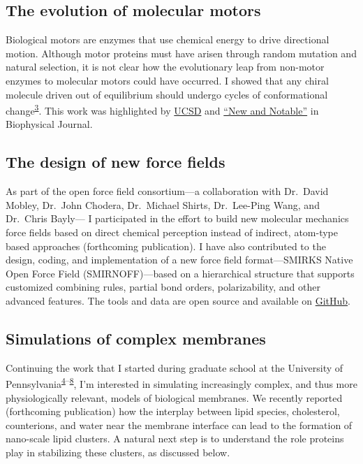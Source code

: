 \documentclass[11pt,notitlepage]{article}
\begin{document}
\hypertarget{the-evolution-of-molecular-motors}{%
\subsection{The evolution of molecular
motors}\label{the-evolution-of-molecular-motors}}

Biological motors are enzymes that use chemical energy to drive
directional motion. Although motor proteins must have arisen through
random mutation and natural selection, it is not clear how the
evolutionary leap from non-motor enzymes to molecular motors could have
occurred. I showed that any chiral molecule driven out of equilibrium
should undergo cycles of conformational
change\textsuperscript{\protect\hyperlink{ref-1BfYw0gk2}{3}}. This work
was highlighted by
\href{http://ucsdhealthsciences.tumblr.com/post/173707350285/its-not-intelligent-design-so-how-did}{UCSD}
and
\href{https://www.cell.com/biophysj/fulltext/S0006-3495(18)30444-2}{``New
and Notable''} in Biophysical Journal.

\hypertarget{the-design-of-new-force-fields}{%
\subsection{The design of new force
fields}\label{the-design-of-new-force-fields}}

As part of the open force field consortium---a collaboration with
Dr.~David Mobley, Dr.~John Chodera, Dr.~Michael Shirts, Dr.~Lee-Ping
Wang, and Dr.~Chris Bayly--- I participated in the effort to build new
molecular mechanics force fields based on direct chemical perception
instead of indirect, atom-type based approaches (forthcoming
publication). I have also contributed to the design, coding, and
implementation of a new force field format---SMIRKS Native Open Force
Field (SMIRNOFF)---based on a hierarchical structure that supports
customized combining rules, partial bond orders, polarizability, and
other advanced features. The tools and data are open source and
available on \href{https://github.com/openforcefield}{GitHub}.

\hypertarget{simulations-of-complex-membranes}{%
\subsection{Simulations of complex
membranes}\label{simulations-of-complex-membranes}}

Continuing the work that I started during graduate school at the
University of
Pennsylvania\textsuperscript{\protect\hyperlink{ref-1G0A01ZNq}{4}--\protect\hyperlink{ref-1AHXI1BtY}{8}},
I'm interested in simulating increasingly complex, and thus more
physiologically relevant, models of biological membranes. We recently
reported (forthcoming publication) how the interplay between lipid
species, cholesterol, counterions, and water near the membrane interface
can lead to the formation of nano-scale lipid clusters. A natural next
step is to understand the role proteins play in stabilizing these
clusters, as discussed below.
\end{document}
